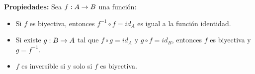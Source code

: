     \textbf{Propiedades:}
    Sea $f : A\rightarrow B$ una función:
    \begin{itemize}
        \item Si $f$ es biyectiva, entonces $f^{-1}\circ f = id_A$ es igual a la función identidad.
        \item Si existe $g : B\rightarrow A$ tal que $f\circ g = id_A$ y $g\circ f = id_B$, entonces $f$ es biyectiva y $g = f^{-1}$.
        \item $f$ es inversible si y solo si $f$ es biyectiva.
    \end{itemize}
  
